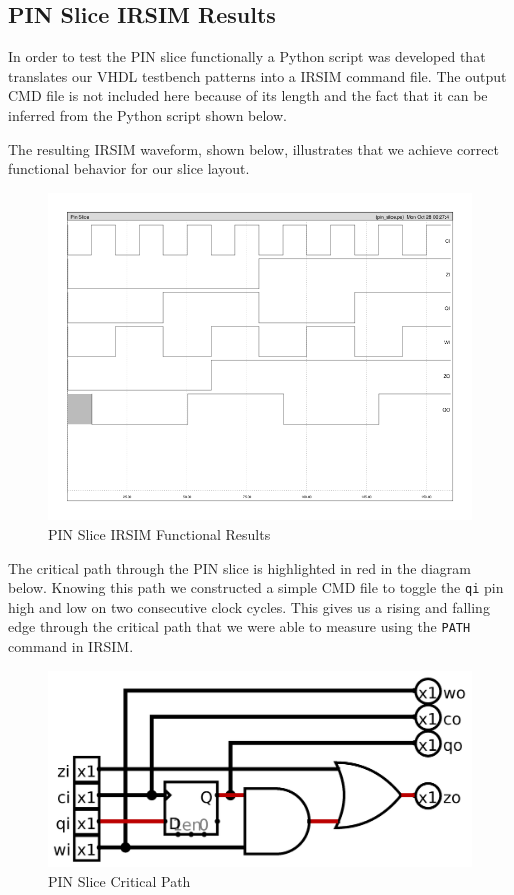     \subsection{PIN Slice IRSIM Results}

        In order to test the PIN slice functionally a Python script was
        developed that translates our VHDL testbench patterns into a IRSIM
        command file. The output CMD file is not included here because of its
        length and the fact that it can be inferred from the Python script shown
        below.

        

        The resulting IRSIM waveform, shown below, illustrates that we achieve
        correct functional behavior for our slice layout.

        \begin{figure}[H]
            \centering
            \includegraphics[width=0.75\linewidth]{../../irsim/pin_slice.png}
            \caption{PIN Slice IRSIM Functional Results}
        \end{figure}

        \newpage

        The critical path through the PIN slice is highlighted in red in the
        diagram below. Knowing this path we constructed a simple CMD file to
        toggle the \texttt{qi} pin high and low on two consecutive clock
        cycles. This gives us a rising and falling edge through the critical
        path that we were able to measure using the \texttt{PATH} command in
        IRSIM. 

        \begin{figure}[H]
            \centering
            \includegraphics[width=0.75\linewidth]{../../logisim/pin_slice_crit_path.png}
            \caption{PIN Slice Critical Path}
        \end{figure}

